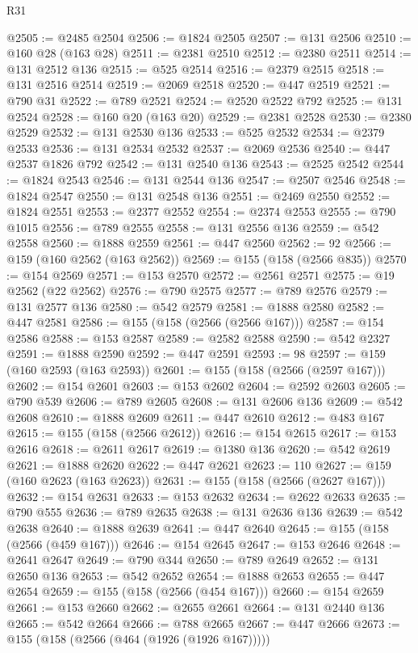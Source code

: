 \begin{lexlean}{R31}
\begin{coremodule}
@2505 := @2485 @2504
@2506 := @1824 @2505
@2507 := @131 @2506
@2510 := @160 @28 (@163 @28)
@2511 := @2381 @2510
@2512 := @2380 @2511
@2514 := @131 @2512 @136
@2515 := @525 @2514
@2516 := @2379 @2515
@2518 := @131 @2516 @2514
@2519 := @2069 @2518
@2520 := @447 @2519
@2521 := @790 @31
@2522 := @789 @2521
@2524 := @2520 @2522 @792
@2525 := @131 @2524
@2528 := @160 @20 (@163 @20)
@2529 := @2381 @2528
@2530 := @2380 @2529
@2532 := @131 @2530 @136
@2533 := @525 @2532
@2534 := @2379 @2533
@2536 := @131 @2534 @2532
@2537 := @2069 @2536
@2540 := @447 @2537 @1826 @792
@2542 := @131 @2540 @136
@2543 := @2525 @2542
@2544 := @1824 @2543
@2546 := @131 @2544 @136
@2547 := @2507 @2546
@2548 := @1824 @2547
@2550 := @131 @2548 @136
@2551 := @2469 @2550
@2552 := @1824 @2551
@2553 := @2377 @2552
@2554 := @2374 @2553
@2555 := @790 @1015
@2556 := @789 @2555
@2558 := @131 @2556 @136
@2559 := @542 @2558
@2560 := @1888 @2559
@2561 := @447 @2560
@2562 := 92
@2566 := @159 (@160 @2562 (@163 @2562))
@2569 := @155 (@158 (@2566 @835))
@2570 := @154 @2569
@2571 := @153 @2570
@2572 := @2561 @2571
@2575 := @19 @2562 (@22 @2562)
@2576 := @790 @2575
@2577 := @789 @2576
@2579 := @131 @2577 @136
@2580 := @542 @2579
@2581 := @1888 @2580
@2582 := @447 @2581
@2586 := @155 (@158 (@2566 (@2566 @167)))
@2587 := @154 @2586
@2588 := @153 @2587
@2589 := @2582 @2588
@2590 := @542 @2327
@2591 := @1888 @2590
@2592 := @447 @2591
@2593 := 98
@2597 := @159 (@160 @2593 (@163 @2593))
@2601 := @155 (@158 (@2566 (@2597 @167)))
@2602 := @154 @2601
@2603 := @153 @2602
@2604 := @2592 @2603
@2605 := @790 @539
@2606 := @789 @2605
@2608 := @131 @2606 @136
@2609 := @542 @2608
@2610 := @1888 @2609
@2611 := @447 @2610
@2612 := @483 @167
@2615 := @155 (@158 (@2566 @2612))
@2616 := @154 @2615
@2617 := @153 @2616
@2618 := @2611 @2617
@2619 := @1380 @136
@2620 := @542 @2619
@2621 := @1888 @2620
@2622 := @447 @2621
@2623 := 110
@2627 := @159 (@160 @2623 (@163 @2623))
@2631 := @155 (@158 (@2566 (@2627 @167)))
@2632 := @154 @2631
@2633 := @153 @2632
@2634 := @2622 @2633
@2635 := @790 @555
@2636 := @789 @2635
@2638 := @131 @2636 @136
@2639 := @542 @2638
@2640 := @1888 @2639
@2641 := @447 @2640
@2645 := @155 (@158 (@2566 (@459 @167)))
@2646 := @154 @2645
@2647 := @153 @2646
@2648 := @2641 @2647
@2649 := @790 @344
@2650 := @789 @2649
@2652 := @131 @2650 @136
@2653 := @542 @2652
@2654 := @1888 @2653
@2655 := @447 @2654
@2659 := @155 (@158 (@2566 (@454 @167)))
@2660 := @154 @2659
@2661 := @153 @2660
@2662 := @2655 @2661
@2664 := @131 @2440 @136
@2665 := @542 @2664
@2666 := @788 @2665
@2667 := @447 @2666
@2673 := @155 (@158 (@2566 (@464 (@1926 (@1926 @167)))))

\end{coremodule}
\end{lexlean}
